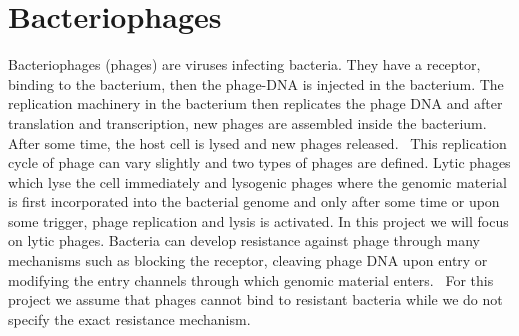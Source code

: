 




\section{Bacteriophages}
Bacteriophages (phages) are viruses infecting bacteria. They have a receptor, binding to the bacterium, then the phage-DNA is injected in the bacterium. The replication machinery in the bacterium then replicates the phage DNA and after translation and transcription, new phages are assembled inside the bacterium. After some time, the host cell is lysed and new phages released.~\cite{Labrie2010-rl} This replication cycle of phage can vary slightly and two types of phages are defined. Lytic phages which lyse the cell immediately and lysogenic phages where the genomic material is first incorporated into the bacterial genome and only after some time or upon some trigger, phage replication and lysis is activated. In this project we will focus on lytic phages. Bacteria can develop resistance against phage through many mechanisms such as blocking the receptor, cleaving phage DNA upon entry or modifying the entry channels through which genomic material enters.~\cite{Labrie2010-rl} For this project we assume that phages cannot bind to resistant bacteria while we do not specify the exact resistance mechanism.

